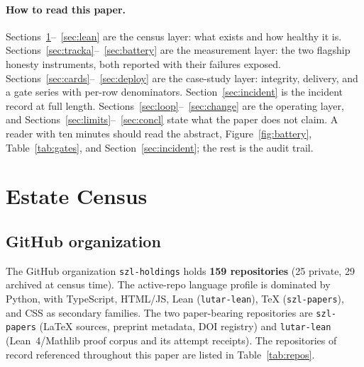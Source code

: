 ﻿\documentclass[11pt]{article}
\begin{document}
\paragraph{How to read this paper.} Sections~\ref{sec:census}--~\ref{sec:lean} are the census layer: what exists and how healthy it is. Sections~\ref{sec:tracka}--~\ref{sec:battery} are the measurement layer: the two flagship honesty instruments, both reported with their failures exposed. Sections~\ref{sec:cards}--~\ref{sec:deploy} are the case-study layer: integrity, delivery, and a gate series with per-row denominators. Section~\ref{sec:incident} is the incident record at full length. Sections~\ref{sec:loop}--~\ref{sec:change} are the operating layer, and Sections~\ref{sec:limits}--~\ref{sec:concl} state what the paper does not claim. A reader with ten minutes should read the abstract, Figure~\ref{fig:battery}, Table~\ref{tab:gates}, and Section~\ref{sec:incident}; the rest is the audit trail.

\section{Estate Census}
\label{sec:census}

\subsection{GitHub organization}
The GitHub organization \texttt{szl-holdings} holds \textbf{159 repositories} (25 private, 29 archived at census time). The active-repo language profile is dominated by Python, with TypeScript, HTML/JS, Lean (\texttt{lutar-lean}), TeX (\texttt{szl-papers}), and CSS as secondary families. The two paper-bearing repositories are \texttt{szl-papers} (LaTeX sources, preprint metadata, DOI registry) and \texttt{lutar-lean} (Lean~4/Mathlib proof corpus and its attempt receipts). The repositories of record referenced throughout this paper are listed in Table~\ref{tab:repos}.
\end{document}
